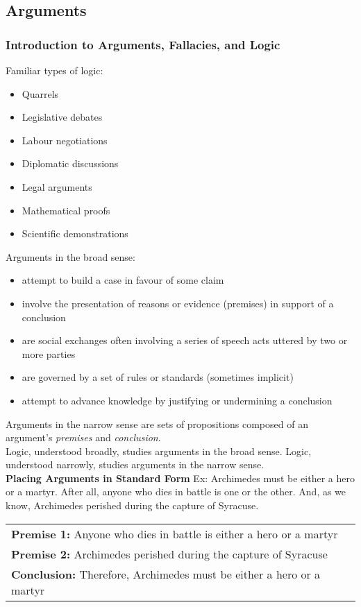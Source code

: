 \subsection{Arguments}
\subsubsection{Introduction to Arguments, Fallacies, and Logic}
Familiar types of logic:
\begin{itemize}
    \item Quarrels
    \item Legislative debates
    \item Labour negotiations
    \item Diplomatic discussions
    \item Legal arguments
    \item Mathematical proofs
    \item Scientific demonstrations
\end{itemize}
Arguments in the broad sense:
\begin{itemize}
    \item attempt to build a case in favour of some claim
    \item involve the presentation of reasons or evidence (premises) in support of a conclusion
    \item are social exchanges often involving a series of speech acts uttered by two or more parties
    \item are governed by a set of rules or standards (sometimes implicit)
    \item attempt to advance knowledge by justifying or undermining a conclusion
\end{itemize}
Arguments in the narrow sense are sets of propositions composed of an argument's \textit{premises} and \textit{conclusion}.\\
Logic, understood broadly, studies arguments in the broad sense.
Logic, understood narrowly, studies arguments in the narrow sense.\\

\textbf{Placing Arguments in Standard Form}
Ex: Archimedes must be either a hero or a martyr. After all, anyone who dies in battle is one or the other. And, as we know, Archimedes perished during the capture of Syracuse.\\

\begin{tabular}{p{16cm}}
\textbf{Premise 1:} Anyone who dies in battle is either a hero or a martyr\\
\textbf{Premise 2:} Archimedes perished during the capture of Syracuse\\
\hline
\textbf{Conclusion:} Therefore, Archimedes must be either a hero or a martyr
\end{tabular}\\

